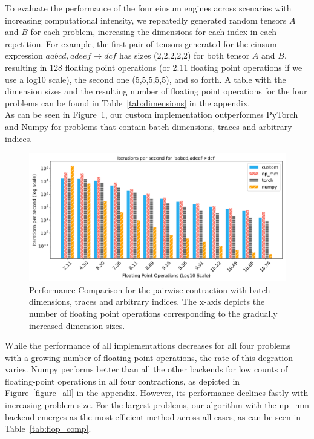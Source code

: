 \noindent To evaluate the performance of the four einsum engines across scenarios with increasing computational intensity, we repeatedly generated random tensors $A$ and $B$ for each problem, increasing the dimensions for each index in each repetition. For example, the first pair of tensors generated for the einsum expression $aabcd,adeef\rightarrow dcf$ has sizes (2,2,2,2,2) for both tensor $A$ and $B$, resulting in 128 floating point operations (or 2.11 floating point operations if we use a log10 scale), the second one (5,5,5,5,5), and so forth. A table with the dimension sizes and the resulting number of floating point operations for the four problems can be found in Table~\ref{tab:dimensions} in the appendix.\\

\noindent As can be seen in Figure~\ref{pic:flops}, our custom implementation outperformes PyTorch and Numpy for problems that contain batch dimensions, traces and arbitrary indices.
\begin{figure}[h]
    
    \centering
    \includegraphics[width=1\textwidth]{images/aabcd_adeef__dcf.png}  %
    \caption{Performance Comparison for the pairwise contraction with batch dimensions, traces and arbitrary indices. The x-axis depicts the number of floating point operations corresponding to the gradually increased dimension sizes.}
    \label{pic:flops} 
\end{figure}

\noindent While the performance of all implementations decreases for all four problems with a growing number of floating-point operations, the rate of this degration varies. Numpy performs better than all the other backends for low counts of floating-point operations in all four contractions, as depicted in Figure~\ref{figure_all} in the appendix. However, its performance declines fastly with increasing problem size. For the largest problems, our algorithm with the np\_mm backend emerges as the most efficient method across all cases, as can be seen in Table~\ref{tab:flop_comp}.

